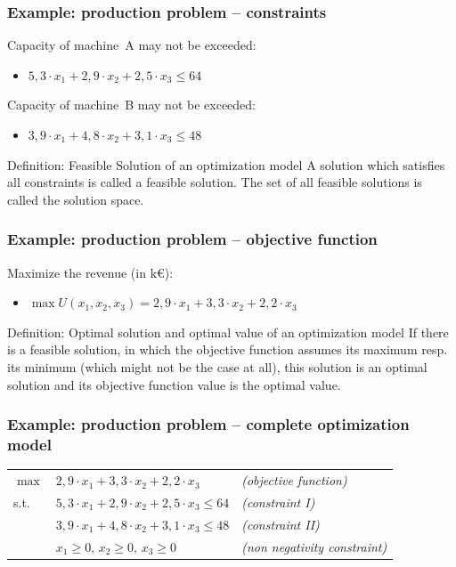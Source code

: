 \begin{frame}
 \frametitle{Example: production problem -- constraints}
  
  Capacity of machine~A may not be exceeded:
  \begin{itemize}
   \item $5,3 \cdot x_1 + 2,9 \cdot x_2 + 2,5 \cdot x_3 \leq 64$
  \end{itemize}

  Capacity of machine~B may not be exceeded:
  \begin{itemize}
   \item $3,9 \cdot x_1 + 4,8 \cdot x_2 + 3,1 \cdot x_3 \leq 48$
  \end{itemize}
 
 \begin{block}{Definition: Feasible Solution of an optimization model}
  A solution which satisfies all constraints is called a feasible solution. The set of all feasible solutions is called the solution space. 
 \end{block}
\end{frame}

\begin{frame}
 \frametitle{Example: production problem -- objective function}
 Maximize the revenue (in k€):
 \begin{itemize}
  \item $\max U(x_1, x_2, x_3) = 2,9\cdot x_1 + 3,3\cdot x_2 + 2,2\cdot x_3$
 \end{itemize}
 
 \begin{block}{Definition: Optimal solution and optimal value of an optimization model}
  If there is a feasible solution, in which the objective function assumes its maximum resp. its minimum (which might not be the case at all), this solution is an optimal solution and its objective function value is the optimal value.
 \end{block}
\end{frame}

\begin{frame}\small
 \frametitle{Example: production problem -- complete optimization model}
 \begin{tabularx}{\linewidth}{ll@{\quad}>{\itshape\footnotesize}X}
 $\max$ & $2,9\cdot x_1 + 3,3\cdot x_2 + 2,2\cdot x_3$ & (objective function)\\
 s.t. & $5,3\cdot x_1 + 2,9\cdot x_2 + 2,5\cdot x_3 \leq 64$ & (constraint I)\\
      & $3,9\cdot x_1 + 4,8\cdot x_2 + 3,1\cdot x_3 \leq 48$ & (constraint II)\\
      & $x_1\geq0,\,x_2\geq0,\,x_3\geq0$ & (non negativity constraint)\\
\end{tabularx}
\end{frame}




